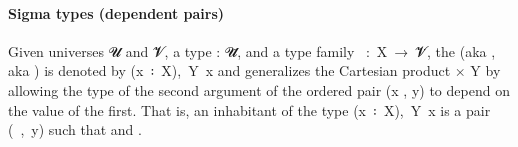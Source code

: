 \paragraph*{Sigma types (dependent pairs)} %

Given universes \ab 𝓤 and \ab 𝓥, a type  \as : \ab 𝓤\af ̇, and a type family ~\as :~\ab X~\as →~\ab 𝓥\af ̇, the  (aka , aka ) is denoted by (\ab x~\af ꞉~\ab X),~\ab Y~\ab x and generalizes the Cartesian product  \af × \ab Y by allowing the type  of the second argument of the ordered pair (\ab x \af , \ab y) to depend on the value  of the first. That is, an inhabitant of the type (\ab x~\af ꞉~\ab X),~\ab Y~\ab x is a pair (~\af ,~\ab y) such that  and .

